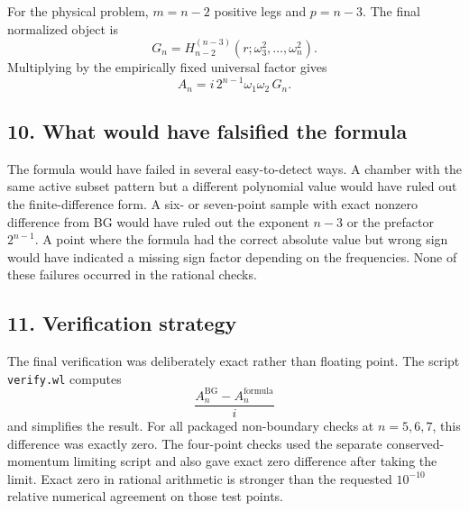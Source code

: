 \documentclass[11pt]{article}
\begin{document}
For the physical problem, \(m=n-2\) positive legs and \(p=n-3\). The final
normalized object is
\[
    G_n
    =
    H_{n-2}^{(n-3)}(r;\omega_3^2,\ldots,\omega_n^2).
\]
Multiplying by the empirically fixed universal factor gives
\[
    A_n=i\,2^{n-1}\omega_1\omega_2\,G_n.
\]

\subsection*{10. What would have falsified the formula}

The formula would have failed in several easy-to-detect ways. A chamber with
the same active subset pattern but a different polynomial value would have
ruled out the finite-difference form. A six- or seven-point sample with exact
nonzero difference from BG would have ruled out the exponent \(n-3\) or the
prefactor \(2^{n-1}\). A point where the formula had the correct absolute value
but wrong sign would have indicated a missing sign factor depending on the
frequencies. None of these failures occurred in the rational checks.

\subsection*{11. Verification strategy}

The final verification was deliberately exact rather than floating point. The
script \texttt{verify.wl} computes
\[
    \frac{A_n^{\mathrm{BG}}-A_n^{\mathrm{formula}}}{i}
\]
and simplifies the result. For all packaged non-boundary checks at
\(n=5,6,7\), this difference was exactly zero. The four-point checks used the
separate conserved-momentum limiting script and also gave exact zero difference
after taking the limit. Exact zero in rational arithmetic is stronger than the
requested \(10^{-10}\) relative numerical agreement on those test points.
\end{document}
